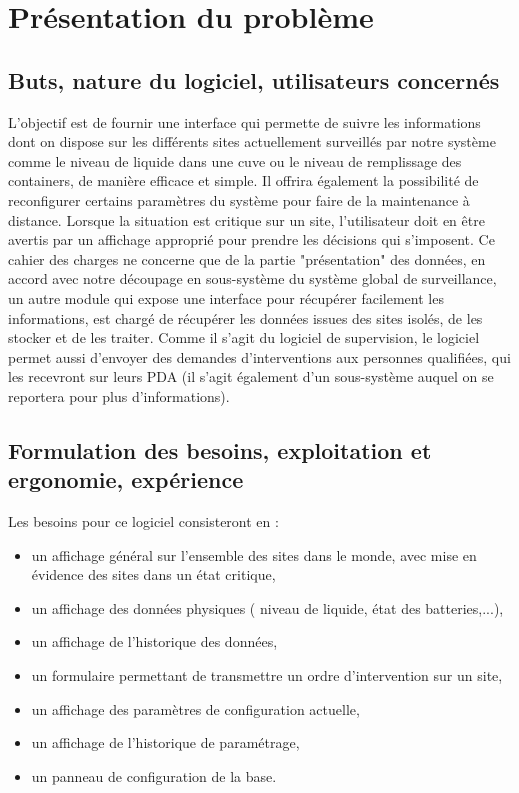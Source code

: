 \section{Présentation du problème}
\subsection{Buts, nature du logiciel, utilisateurs concernés}
L'objectif est de fournir une interface qui permette de suivre les informations dont on dispose sur les différents sites actuellement surveillés par notre système comme le niveau de liquide dans une cuve ou le niveau de remplissage des containers, de manière efficace et simple. Il offrira également la possibilité de reconfigurer certains paramètres du système pour faire de la maintenance à distance.
Lorsque la situation est critique sur un site, l'utilisateur doit en être avertis par un affichage approprié pour prendre les décisions qui s'imposent.
Ce cahier des charges ne concerne que de la partie "présentation" des données, en accord avec notre découpage en sous-système du système global de surveillance, un autre module  qui expose une interface pour récupérer facilement les informations, est chargé de récupérer les données issues des sites isolés, de les stocker et de les traiter.
Comme il s'agit du logiciel de supervision, le logiciel permet aussi d'envoyer des demandes d'interventions aux personnes qualifiées, qui les recevront sur leurs PDA (il s'agit également d'un sous-système auquel on se reportera pour plus d'informations).

\subsection{Formulation des besoins, exploitation et ergonomie, expérience}
Les besoins pour ce logiciel consisteront en :
\begin{itemize}
	\item un affichage général sur l'ensemble des sites dans le monde, avec mise en évidence des sites dans un état critique,
	\item un affichage des données physiques ( niveau de liquide, état des batteries,...),
	\item un affichage de l'historique des données,
	\item un formulaire permettant de transmettre un ordre d'intervention sur un site,
	\item un affichage des paramètres de configuration actuelle,
	\item un affichage de l'historique de paramétrage,
	\item un panneau de configuration de la base.
\end{itemize}


